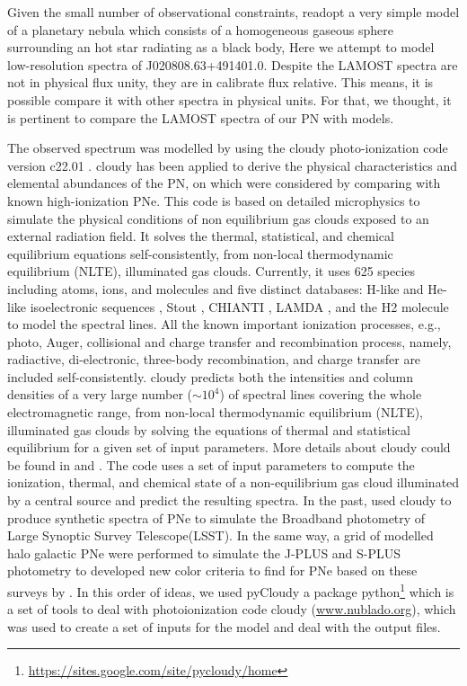 \documentclass[fleqn,usenatbib]{mnras}
\begin{document}
{\begin{table}
\begin{tabular}{lc}
                 \hline
	\end{tabular}
\end{table}

Given the small number of observational constraints, readopt a very
simple model of a planetary nebula which consists of a homogeneous
gaseous sphere surrounding an hot star radiating as a black body,
Here we attempt to model low-resolution spectra
of J020808.63+491401.0. Despite the LAMOST spectra are not in physical flux unity,
they are in calibrate flux relative. This means, it is possible compare it with other
spectra in physical units. For that, we thought, it is pertinent to
compare the LAMOST spectra of our PN with models.


The observed spectrum was modelled by using the {\sc cloudy}
photo-ionization code version c22.01 \citep{Ferland:2017}. {\sc cloudy}
has been applied to derive the physical characteristics and elemental
abundances of the PN, on which were considered by comparing with known high-ionization
PNe. This code is based on detailed microphysics to simulate the physical
conditions of non equilibrium gas clouds exposed to an external
radiation field. It solves the thermal, statistical, and chemical
equilibrium equations self-consistently, from non-local thermodynamic
equilibrium (NLTE), illuminated gas clouds. Currently, it uses 625
species including atoms, ions, and molecules and five distinct
databases: H-like and He-like isoelectronic sequences \citep{Porter:2012},
Stout \citep{Lykins:2015}, CHIANTI \citep{Landi:2012},
LAMDA \citep{Schoier:2005}, and the H2 molecule
\citep{Shaw:2005} to model the spectral lines. All the known
important ionization processes, e.g., photo, Auger, collisional
and charge transfer and recombination process, namely,
radiactive, di-electronic, three-body recombination, and charge
transfer are included self-consistently. {\sc cloudy} predicts both
the intensities and column densities of a very large number
($\sim 10^{4}$) of spectral lines covering the whole electromagnetic
range, from non-local thermodynamic equilibrium (NLTE),
illuminated gas clouds by solving the equations of thermal and
statistical equilibrium for a given set of input parameters. More
details about {\sc cloudy} could be found in \citet{Ferland:2013}
and \citet{Pandey:2022}. The code uses a set of input parameters to compute the
ionization, thermal, and chemical state of a non-equilibrium gas cloud
illuminated by a central source and predict the resulting spectra. 
In the past, \citet{Vejar:2019} used {\sc cloudy} to produce
synthetic spectra of PNe to simulate the  Broadband photometry
of Large Synoptic Survey Telescope(LSST). In the same way, a grid of modelled
halo galactic PNe were performed to simulate the J-PLUS and S-PLUS photometry
to developed new color criteria to find for PNe based on these surveys
by \citet{Gutierrez-Soto:2020}.
In this order of ideas, we used {\sc pyCloudy} \citep{Morisset:2013} a
package python\footnote{\url{https://sites.google.com/site/pycloudy/home}} which
is a set of tools to deal with photoionization code {\sc cloudy} (\url{www.nublado.org}),
which was used to create a set of inputs for the model and deal with the output files.

}
\end{document}
